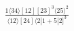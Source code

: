 \documentclass[varwidth, border=5pt]{standalone}
\begin{document}
\begin{my}
$\begin{gathered}
\scriptscriptstyle\frac{1⟨34⟩[12][23]^3⟨25⟩^2}{⟨12⟩[24]⟨2|1+5|2]^3}
\end{gathered}$
\end{my}
\end{document}
